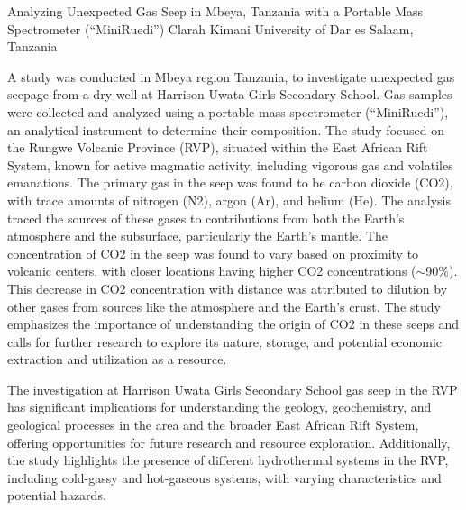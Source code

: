 \begin{conf-abstract}
{Analyzing Unexpected Gas Seep in Mbeya, Tanzania with a Portable Mass Spectrometer (“MiniRuedi”)}
{Clarah Kimani}
{University of Dar es Salaam, Tanzania}
{A study was conducted in Mbeya region Tanzania, to investigate unexpected gas seepage from a dry well at Harrison Uwata Girls Secondary School. Gas samples were collected and analyzed using a portable mass spectrometer (“MiniRuedi”), an analytical instrument to determine their composition. The study focused on the Rungwe Volcanic Province (RVP), situated within the East African Rift System, known for active magmatic activity, including vigorous gas and volatiles emanations. The primary gas in the seep was found to be carbon dioxide (CO2), with trace amounts of nitrogen (N2), argon (Ar), and helium (He). The analysis traced the sources of these gases to contributions from both the Earth's atmosphere and the subsurface, particularly the Earth's mantle.
The concentration of CO2 in the seep was found to vary based on proximity to volcanic centers, with closer locations having higher CO2 concentrations ($\sim$90\%). This decrease in CO2 concentration with distance was attributed to dilution by other gases from sources like the atmosphere and the Earth's crust. The study emphasizes the importance of understanding the origin of CO2 in these seeps and calls for further research to explore its nature, storage, and potential economic extraction and utilization as a resource.

The investigation at Harrison Uwata Girls Secondary School gas seep in the RVP has significant implications for understanding the geology, geochemistry, and geological processes in the area and the broader East African Rift System, offering opportunities for future research and resource exploration. Additionally, the study highlights the presence of different hydrothermal systems in the RVP, including cold-gassy and hot-gaseous systems, with varying characteristics and potential hazards.}
\end{conf-abstract}
